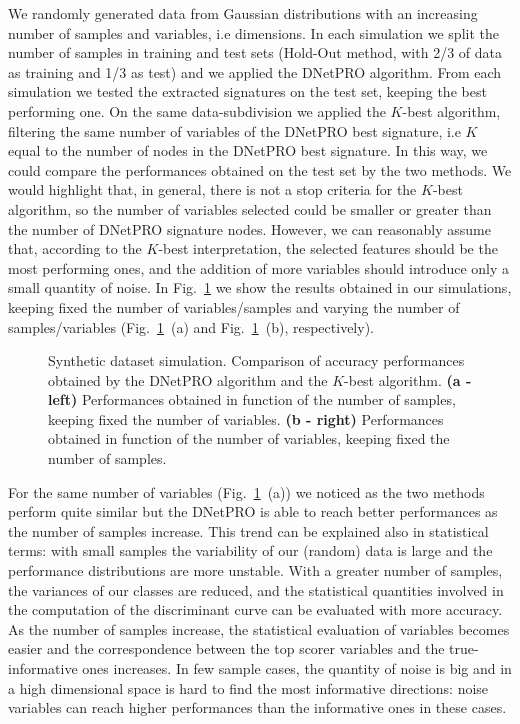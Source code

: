 \documentclass{standalone}
\begin{document}
We randomly generated data from Gaussian distributions with an increasing number of samples and variables, i.e dimensions.
In each simulation we split the number of samples in training and test sets (Hold-Out method, with 2/3 of data as training and 1/3 as test) and we applied the \textsf{DNetPRO} algorithm.
From each simulation we tested the extracted signatures on the test set, keeping the best performing one.
On the same data-subdivision we applied the $K$-best algorithm, filtering the same number of variables of the \textsf{DNetPRO} best signature, i.e $K$ equal to the number of nodes in the \textsf{DNetPRO} best signature.
In this way, we could compare the performances obtained on the test set by the two methods.
We would highlight that, in general, there is not a stop criteria for the $K$-best algorithm, so the number of variables selected could be smaller or greater than the number of \textsf{DNetPRO} signature nodes.
However, we can reasonably assume that, according to the $K$-best interpretation, the selected features should be the most performing ones, and the addition of more variables should introduce only a small quantity of noise.
In Fig.~\ref{fig:dnetpro_toy} we show the results obtained in our simulations, keeping fixed the number of variables/samples and varying the number of samples/variables (Fig.~\ref{fig:dnetpro_toy}~(a) and Fig.~\ref{fig:dnetpro_toy}~(b), respectively).

\begin{figure}[htbp]
\centering
\def\svgwidth{0.4\textwidth}

\qquad\qquad
\centering
\def\svgwidth{0.4\textwidth}

\caption{Synthetic dataset simulation.
Comparison of accuracy performances obtained by the \textsf{DNetPRO} algorithm and the $K$-best algorithm.
\textbf{(a - left)} Performances obtained in function of the number of samples, keeping fixed the number of variables.
\textbf{(b - right)} Performances obtained in function of the number of variables, keeping fixed the number of samples.
}
\label{fig:dnetpro_toy}
\end{figure}

For the same number of variables (Fig.~\ref{fig:dnetpro_toy}~(a)) we noticed as the two methods perform quite similar but the \textsf{DNetPRO} is able to reach better performances as the number of samples increase.
This trend can be explained also in statistical terms: with small samples the variability of our (random) data is large and the performance distributions are more unstable.
With a greater number of samples, the variances of our classes are reduced, and the statistical quantities involved in the computation of the discriminant curve can be evaluated with more accuracy.
As the number of samples increase, the statistical evaluation of variables becomes easier and the correspondence between the top scorer variables and the true-informative ones increases.
In few sample cases, the quantity of noise is big and in a high dimensional space is hard to find the most informative directions: noise variables can reach higher performances than the informative ones in these cases.
\end{document}

